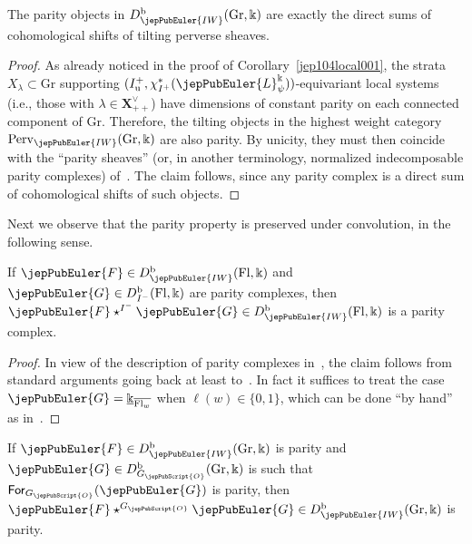 \setcounter{thm}{11}
\begin{prop}\label{jep104new0412}
The parity objects in $D^{\mathrm b}_{\jepPubEuler{IW}}(\mathrm{Gr},\Bbbk)$ are exactly the direct sums of cohomological shifts of tilting perverse sheaves.
\end{prop}
\begin{proof}
As already noticed in the proof of Corollary~\ref{jep104local001}, the strata $X_{\lambda}\subset\mathrm{Gr}$ supporting $(I^+_{\mathrm u},\chi_{I^+}^*(\jepPubEuler{L}^{\Bbbk}_{\psi}))$-equivariant local systems (i.e., those with $\lambda\in\boldsymbol{X}^{\vee}_{++}$) have dimensions of constant parity on each connected component of $\mathrm{Gr}$.
Therefore, the tilting objects in the highest weight category $\mathrm{Perv}_{\jepPubEuler{IW}}(\mathrm{Gr},\Bbbk)$ are also parity.
By unicity, they must then coincide with the ``parity sheaves'' (or, in another terminology, normalized indecomposable parity complexes) of~\cite[Def.~2.14]{jep104ref31}.
The claim follows, since any parity complex is a direct sum of cohomological shifts of such objects.
\end{proof}
Next we observe that the parity property is preserved under convolution, in the following sense.
\begin{lem}\label{jep104new0413}
If $\jepPubEuler{F}\in D^{\mathrm b}_{\jepPubEuler{IW}}(\mathrm{Fl},\Bbbk)$ and $\jepPubEuler{G}\in D^{\mathrm b}_{I^-}(\mathrm{Fl},\Bbbk)$ are parity complexes, then $\jepPubEuler{F}\star^{I^-}\jepPubEuler{G}\in D^{\mathrm b}_{\jepPubEuler{IW}}(\mathrm{Fl},\Bbbk)$ is a parity complex.
\end{lem}
\begin{proof}
In view of the description of parity complexes in~\cite[\S4.1]{jep104ref31}, the claim follows from standard arguments going back at least to~\cite{jep104ref43}.
In fact it suffices to treat the case $\jepPubEuler{G}=\underline{\Bbbk}_{\overline{\mathrm{Fl}_{w}}}$ when $\ell(w)\in\{0,1\}$, which can be done ``by hand'' as in~\cite{jep104ref43}.
\end{proof}
\begin{lem}\label{jep104new0414}
If $\jepPubEuler{F}\in D^{\mathrm b}_{\jepPubEuler{IW}}(\mathrm{Gr},\Bbbk)$ is parity and $\jepPubEuler{G}\in D^{\mathrm b}_{G_{\jepPubScript{O}}}(\mathrm{Gr},\Bbbk)$ is such that $\mathsf{For}_{G_{\jepPubScript{O}}}(\jepPubEuler{G})$ is parity, then $\jepPubEuler{F}\star^{G_{\jepPubScript{O}}}\jepPubEuler{G}\in D^{\mathrm b}_{\jepPubEuler{IW}}(\mathrm{Gr},\Bbbk)$ is parity.
\end{lem}

